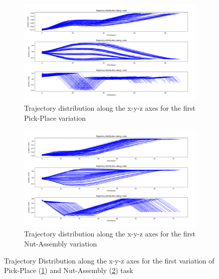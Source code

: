 \begin{figure}[htb]
    \centering
    \begin{subfigure}[b]{0.9\textwidth}
        \centering
        \includegraphics[width=\textwidth]{Figures/images/dataset_distribution/pick_place_variation_0.png}
        \caption{Trajectory distribution along the x-y-z axes for the first Pick-Place variation}
        \label{fig:pick_place_first_variation}
    \end{subfigure}
    \hfil
    \begin{subfigure}[b]{0.9\textwidth}
        \centering
        \includegraphics[width=\textwidth]{Figures/images/dataset_distribution/nut_assembly_variation_0.png}
        \caption{Trajectory distribution along the x-y-z axes for the first Nut-Assembly variation}
        \label{fig:nut_assembly_first_variation}
    \end{subfigure}
    \caption{Trajectory Distribution along the x-y-z axes for the first variation of Pick-Place (\ref{fig:pick_place_first_variation}) and Nut-Assembly (\ref{fig:nut_assembly_first_variation}) task}
    \label{fig:dataset_distribution}
\end{figure}
